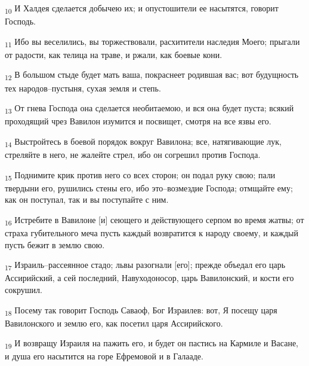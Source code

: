 \begin{tcolorbox}
\textsubscript{10} И Халдея сделается добычею их; и опустошители ее насытятся, говорит Господь.
\end{tcolorbox}
\begin{tcolorbox}
\textsubscript{11} Ибо вы веселились, вы торжествовали, расхитители наследия Моего; прыгали от радости, как телица на траве, и ржали, как боевые кони.
\end{tcolorbox}
\begin{tcolorbox}
\textsubscript{12} В большом стыде будет мать ваша, покраснеет родившая вас; вот будущность тех народов--пустыня, сухая земля и степь.
\end{tcolorbox}
\begin{tcolorbox}
\textsubscript{13} От гнева Господа она сделается необитаемою, и вся она будет пуста; всякий проходящий чрез Вавилон изумится и посвищет, смотря на все язвы его.
\end{tcolorbox}
\begin{tcolorbox}
\textsubscript{14} Выстройтесь в боевой порядок вокруг Вавилона; все, натягивающие лук, стреляйте в него, не жалейте стрел, ибо он согрешил против Господа.
\end{tcolorbox}
\begin{tcolorbox}
\textsubscript{15} Поднимите крик против него со всех сторон; он подал руку свою; пали твердыни его, рушились стены его, ибо это--возмездие Господа; отмщайте ему; как он поступал, так и вы поступайте с ним.
\end{tcolorbox}
\begin{tcolorbox}
\textsubscript{16} Истребите в Вавилоне [и] сеющего и действующего серпом во время жатвы; от страха губительного меча пусть каждый возвратится к народу своему, и каждый пусть бежит в землю свою.
\end{tcolorbox}
\begin{tcolorbox}
\textsubscript{17} Израиль--рассеянное стадо; львы разогнали [его]; прежде объедал его царь Ассирийский, а сей последний, Навуходоносор, царь Вавилонский, и кости его сокрушил.
\end{tcolorbox}
\begin{tcolorbox}
\textsubscript{18} Посему так говорит Господь Саваоф, Бог Израилев: вот, Я посещу царя Вавилонского и землю его, как посетил царя Ассирийского.
\end{tcolorbox}
\begin{tcolorbox}
\textsubscript{19} И возвращу Израиля на пажить его, и будет он пастись на Кармиле и Васане, и душа его насытится на горе Ефремовой и в Галааде.
\end{tcolorbox}
